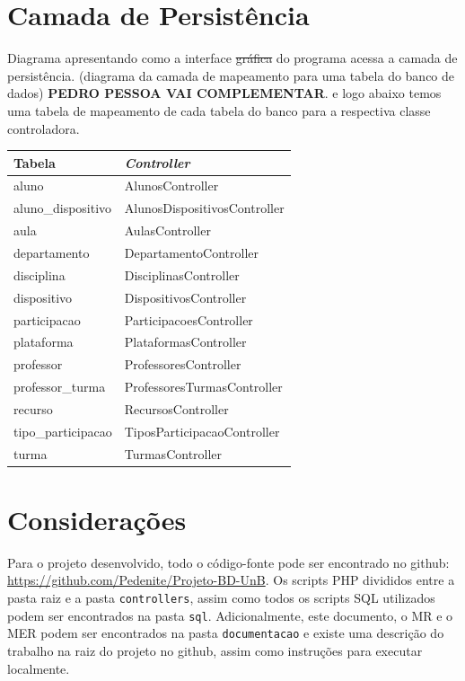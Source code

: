 \documentclass[12pt]{article}
\begin{document}
\section*{Camada de Persistência}
Diagrama apresentando como a interface \sout{gráfica} do programa acessa a camada de persistência. (diagrama da camada de mapeamento para uma tabela do banco de dados) \textbf{PEDRO PESSOA VAI COMPLEMENTAR}.  e logo abaixo temos uma tabela de mapeamento de cada tabela do banco para a respectiva classe controladora.

\begin{center}
    \begin{tabular}{|p{}|p{}|}
        \hline
        \textbf{Tabela} & \textbf{\textit{Controller}} \\
        \hline
        aluno & AlunosController \\
        \hline 
        aluno\_dispositivo & AlunosDispositivosController \\
        \hline  
        aula & AulasController \\
        \hline 
        departamento & DepartamentoController \\
        \hline
        disciplina & DisciplinasController \\
        \hline
        dispositivo & DispositivosController \\
        \hline
        participacao & ParticipacoesController \\
        \hline
        plataforma & PlataformasController \\
        \hline
        professor & ProfessoresController \\
        \hline
        professor\_turma & ProfessoresTurmasController \\
        \hline
        recurso & RecursosController \\
        \hline
        tipo\_participacao & TiposParticipacaoController \\
        \hline
        turma & TurmasController \\
        \hline
    \end{tabular}\label{mapeamento-controller}
\end{center}

\section*{Considerações}
Para o projeto desenvolvido, todo o código-fonte pode ser encontrado no github: \url{https://github.com/Pedenite/Projeto-BD-UnB}. Os scripts PHP divididos entre a pasta raiz e a pasta \texttt{controllers}, assim como todos os scripts SQL utilizados podem ser encontrados na pasta \texttt{sql}. Adicionalmente, este documento, o MR e o MER podem ser encontrados na pasta \texttt{documentacao} e existe uma descrição do trabalho na raiz do projeto no github, assim como instruções para executar localmente.
\end{document}
